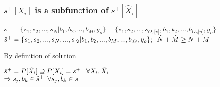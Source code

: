 \documentclass[11pt]{article}
\begin{document}
\subsubsection{$s^+[X_i]$ is a subfunction of $s^+[\hat{X}_i]$}
\begin{center}
\vspace{1mm}
$
s^+ = \{ s_1,s_2,...,s_N|b_1,b_2,...,b_M,y_o\} = \{ s_1,s_2,...,s_{O_T \lbrack n \rbrack }, b_1, b_2,...,b_{O_S \lbrack n \rbrack},y_o \}
$
\\ \vspace{2mm}
$
\hat{s}^+ = \{ s_1,s_2,...,s_N,...,s_{\hat{N}}|b_1,b_2,...,b_M,...,b_{\hat{M}},y_o\}; \hspace{2mm} \hat{N} + \hat{M} \geq N + M
$
\end{center}
\vspace{2mm}
By definition of solution
\begin{center}
\vspace{1mm}
$
\hat{s}^+ = P[\hat{X}_i] \supseteq P[X_i] = s^+ \hspace{3mm} \forall X_i,\hat{X}_i
$
\\ \vspace{2mm}
$
\Rightarrow s_j,b_k \in \hat{s}^+ \hspace{2mm} \forall s_j,b_k \in s^+
$
\end{center}



\end{document}
